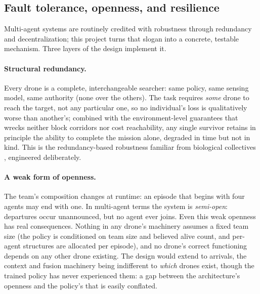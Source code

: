 \subsection{Fault tolerance, openness, and resilience}
\label{subsec:mas-resilience}

Multi-agent systems are routinely credited with robustness through redundancy and
decentralization; this project turns that slogan into a concrete, testable
mechanism. Three layers of the design implement it.

\paragraph{Structural redundancy.}
Every drone is a complete, interchangeable searcher: same policy, same sensing
model, same authority (none over the others). The task requires \emph{some} drone
to reach the target, not any particular one, so no individual's loss is
qualitatively worse than another's; combined with the environment-level
guarantees that wrecks neither block corridors nor cost reachability, any single
survivor retains in principle the ability to complete the mission alone, degraded
in time but not in kind. This is the redundancy-based robustness familiar from
biological collectives \citep{camazine2001self}, engineered deliberately.

\paragraph{A weak form of openness.}
The team's composition changes at runtime: an episode that begins with four
agents may end with one. In multi-agent terms the system is \emph{semi-open}:
departures occur unannounced, but no agent ever joins. Even this weak openness
has real consequences. Nothing in any drone's machinery assumes a fixed team size
(the policy is conditioned on team size and believed alive count, and per-agent
structures are allocated per episode), and no drone's correct functioning depends
on any other drone existing. The design would extend to arrivals, the context and
fusion machinery being indifferent to \emph{which} drones exist, though the
trained policy has never experienced them: a gap between the architecture's
openness and the policy's that is easily conflated.

